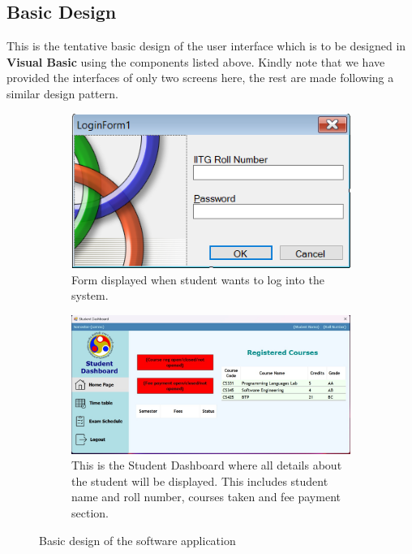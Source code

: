 \documentclass[12pt,a4paper]{article}
\begin{document}
    \subsection{Basic Design}
    This is the tentative basic design of the user interface which is to be designed in \textbf{Visual Basic} using the components listed above. Kindly note that we have provided the interfaces of only two screens here, the rest are made following a similar design pattern.
    \begin{figure}[H]
        \centering
        \begin{subfigure}[b]{0.6\linewidth}
            \includegraphics[width=\linewidth]{LoginForm.png} 
            \caption{Form displayed when student wants to log into the system.}
            \label{fig:sub1}
        \end{subfigure}
        \par\bigskip
        \begin{subfigure}[b]{\linewidth}
            \includegraphics[width=\linewidth]{StudentDashboard.jpeg}
            \caption{This is the Student Dashboard where all details about the student will be displayed. This includes student name and roll number, courses taken and fee payment section. }
            \label{fig:sub2}
        \end{subfigure}
        \caption{Basic design of the software application}
        \label{fig:overall}
    \end{figure}
\end{document}
